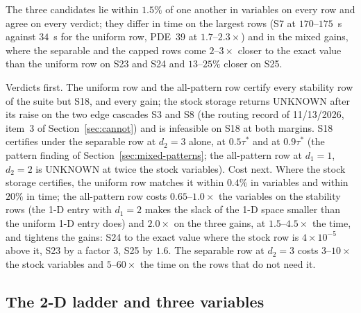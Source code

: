The three candidates lie within $1.5\%$ of one another in variables on every row and agree on every verdict; they differ in time on the largest rows (S7 at $170$--$175$~s against $34$~s for the uniform row, PDE~39 at $1.7$--$2.3\times$) and in the mixed gains, where the separable and the capped rows come $2$--$3\times$ closer to the exact value than the uniform row on S23 and S24 and $13$--$25\%$ closer on S25.

Verdicts first. The uniform row and the all-pattern row certify every stability row of the suite but S18, and every gain; the stock storage returns UNKNOWN after its raise on the two edge cascades S3 and S8 (the routing record of 11/13/2026, item~3 of Section~\ref{sec:cannot}) and is infeasible on S18 at both margins. S18 certifies under the separable row at $d_2=3$ alone, at $0.5\tau^*$ and at $0.9\tau^*$ (the pattern finding of Section~\ref{sec:mixed-patterns}; the all-pattern row at $d_1=1$, $d_2=2$ is UNKNOWN at twice the stock variables). Cost next. Where the stock storage certifies, the uniform row matches it within $0.4\%$ in variables and within $20\%$ in time; the all-pattern row costs $0.65$--$1.0\times$ the variables on the stability rows (the 1-D entry with $d_1=2$ makes the slack of the 1-D space smaller than the uniform 1-D entry does) and $2.0\times$ on the three gains, at $1.5$--$4.5\times$ the time, and tightens the gains: S24 to the exact value where the stock row is $4\times10^{-5}$ above it, S23 by a factor $3$, S25 by $1.6$. The separable row at $d_2=3$ costs $3$--$10\times$ the stock variables and $5$--$60\times$ the time on the rows that do not need it.

\subsection{The 2-D ladder and three variables}\label{sec:bl-fin2}

